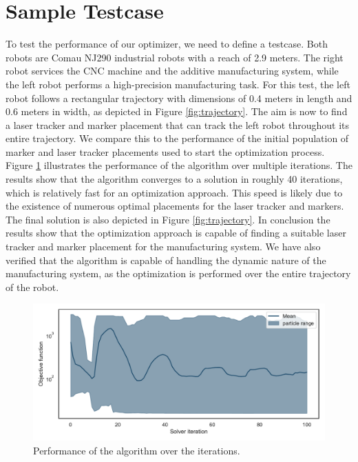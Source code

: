 \documentclass{svproc}
\begin{document}
\section{Sample Testcase}
To test the performance of our optimizer, we need to define a testcase.
Both robots are Comau NJ290 industrial robots with a reach of 2.9 meters.
The right robot services the CNC machine and the additive manufacturing system, while the left robot performs a high-precision manufacturing task.
For this test, the left robot follows a rectangular trajectory with dimensions of 0.4 meters in length and 0.6 meters in width, as depicted in Figure \ref{fig:trajectory}.
The aim is now to find a laser tracker and marker placement that can track the left robot throughout its entire trajectory.
We compare this to the performance of the initial population of marker and laser tracker placements used to start the optimization process.
Figure \ref{fig:iterations} illustrates the performance of the algorithm over multiple iterations.
The results show that the algorithm converges to a solution in roughly 40 iterations, which is relatively fast for an optimization approach.
This speed is likely due to the existence of numerous optimal placements for the laser tracker and markers.
The final solution is also depicted in Figure \ref{fig:trajectory}.
In conclusion the results show that the optimization approach is capable of finding a suitable laser tracker and marker placement for the manufacturing system.
We have also verified that the algorithm is capable of handling the dynamic nature of the manufacturing system, as the optimization is performed over the entire trajectory of the robot.

\begin{figure}
\centering
\includegraphics[width=\textwidth]{figures/iterations.pdf}
\caption{Performance of the algorithm over the iterations.}
\label{fig:iterations}
\end{figure}
\end{document}
